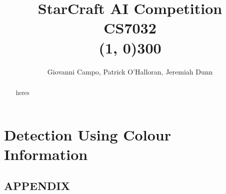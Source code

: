 \documentclass[paper=a4, fontsize=11pt]{report}
\title{
	\usefont{OT1}{bch}{b}{n}StarCraft AI Competition\\\vspace{0.1cm} CS7032
	\\\vspace{-0.5cm}\line(1, 0){300}\vspace{-0.5cm}
}
\author{Giovanni Campo, Patrick O'Halloran, Jeremiah Dunn}
\begin{document}
\maketitle
\newpage


\begin{abstract}

heres
\end{abstract}

\section{Detection Using Colour Information}







\newpage
\subsection*{APPENDIX}


\newpage


\label{endpage}
\end{document}
